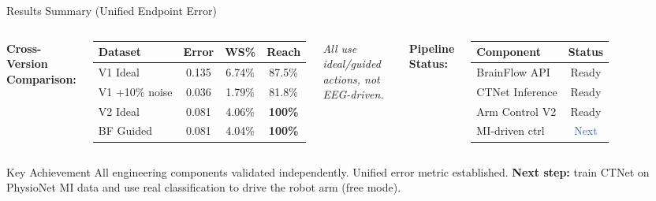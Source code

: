 \documentclass[aspectratio=169, 11pt]{beamer}
\begin{document}
\begin{frame}{Results Summary (Unified Endpoint Error)}
    \begin{columns}[T]
        \textbf{Cross-Version Comparison:}
        \begin{table}
            \centering
            \small
            \begin{tabular}{lccc}
                \toprule
                Dataset & Error & WS\% & Reach \\
                \midrule
                V1 Ideal & 0.135 & 6.74\% & 87.5\% \\
                V1 +10\% noise & 0.036 & 1.79\% & 81.8\% \\
                V2 Ideal & 0.081 & 4.06\% & \textcolor{improved}{\textbf{100\%}} \\
                BF Guided & 0.081 & 4.04\% & \textcolor{improved}{\textbf{100\%}} \\
                \bottomrule
            \end{tabular}
        \end{table}
        \footnotesize \textit{All use ideal/guided actions, not EEG-driven.}
        
        \textbf{Pipeline Status:}
        \begin{table}
            \centering
            \small
            \begin{tabular}{lc}
                \toprule
                Component & Status \\
                \midrule
                BrainFlow API & \textcolor{improved}{Ready} \\
                CTNet Inference & \textcolor{improved}{Ready} \\
                Arm Control V2 & \textcolor{improved}{Ready} \\
                MI-driven ctrl & \textcolor{highlight}{Next} \\
                \bottomrule
            \end{tabular}
        \end{table}
    \end{columns}
    
    \vspace{3mm}
    \begin{block}{Key Achievement}
        All engineering components validated independently. Unified error metric established. \textbf{Next step:} train CTNet on PhysioNet MI data and use real classification to drive the robot arm (free mode).
    \end{block}
\end{frame}
\end{document}
